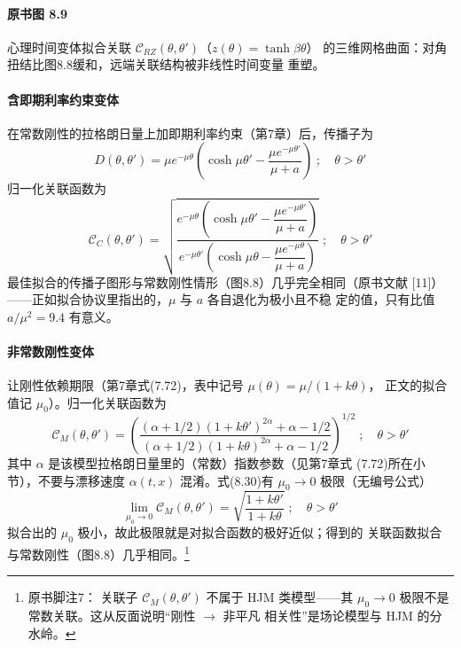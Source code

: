 \paragraph{原书图 8.9}\quad 心理时间变体拟合关联
$\mathcal{C}_{RZ}(\theta,\theta')$（$z(\theta)=\tanh\beta\theta$）
的三维网格曲面：对角扭结比图8.8缓和，远端关联结构被非线性时间变量
重塑。

\paragraph{含即期利率约束变体}
在常数刚性的拉格朗日量上加即期利率约束（第7章）后，传播子为
\begin{equation*}
D(\theta,\theta')=\mu e^{-\mu\theta}
\left(\cosh\mu\theta'-\frac{\mu e^{-\mu\theta'}}{\mu+a}\right)
\;;\quad\theta>\theta'
\tag{8.28}
\end{equation*}
归一化关联函数为
\begin{equation*}
\mathcal{C}_{C}(\theta,\theta')=
\sqrt{\frac{e^{-\mu\theta}\left(\cosh\mu\theta'
-\dfrac{\mu e^{-\mu\theta'}}{\mu+a}\right)}
{e^{-\mu\theta'}\left(\cosh\mu\theta
-\dfrac{\mu e^{-\mu\theta}}{\mu+a}\right)}}\;;\quad\theta>\theta'
\tag{8.29}
\end{equation*}
最佳拟合的传播子图形与常数刚性情形（图8.8）几乎完全相同（原书文献
[11]）——正如拟合协议里指出的，$\mu$ 与 $a$ 各自退化为极小且不稳
定的值，只有比值 $a/\mu^{2}=9.4$ 有意义。

\paragraph{非常数刚性变体}
让刚性依赖期限（第7章式(7.72)，表中记号 $\mu(\theta)=\mu/(1+k\theta)$，
正文的拟合值记 $\mu_{0}$）。归一化关联函数为
\begin{equation*}
\mathcal{C}_{M}(\theta,\theta')=\left(
\frac{(\alpha+1/2)(1+k\theta')^{2\alpha}+\alpha-1/2}
{(\alpha+1/2)(1+k\theta)^{2\alpha}+\alpha-1/2}\right)^{1/2}
\;;\quad\theta>\theta'
\tag{8.30}
\end{equation*}
其中 $\alpha$ 是该模型拉格朗日量里的（常数）指数参数（见第7章式
(7.72)所在小节），不要与漂移速度 $\alpha(t,x)$ 混淆。式(8.30)有
$\mu_{0}\to0$ 极限（无编号公式）
\begin{equation*}
\lim_{\mu_{0}\to0}\mathcal{C}_{M}(\theta,\theta')=
\sqrt{\frac{1+k\theta'}{1+k\theta}}\;;\quad\theta>\theta'
\end{equation*}
拟合出的 $\mu_{0}$ 极小，故此极限就是对拟合函数的极好近似；得到的
关联函数拟合与常数刚性（图8.8）几乎相同。\footnote{原书脚注7：
关联子 $\mathcal{C}_{M}(\theta,\theta')$ 不属于 HJM 类模型——其
$\mu_{0}\to0$ 极限不是常数关联。这从反面说明“刚性 $\to$ 非平凡
相关性”是场论模型与 HJM 的分水岭。}

